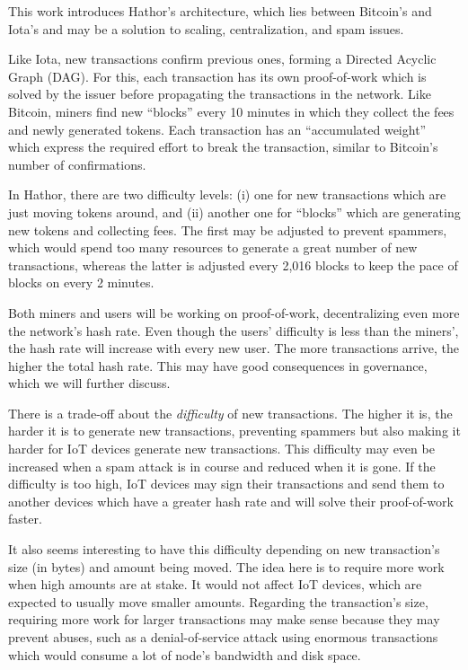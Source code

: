 
This work introduces Hathor's architecture, which lies between Bitcoin's and Iota's and may be a solution to scaling, centralization, and spam issues.

Like Iota, new transactions confirm previous ones, forming a Directed Acyclic Graph (DAG). For this, each transaction has its own proof-of-work which is solved by the issuer before propagating the transactions in the network. Like Bitcoin, miners find new ``blocks'' every 10 minutes in which they collect the fees and newly generated tokens. Each transaction has an ``accumulated weight'' which express the required effort to break the transaction, similar to Bitcoin's number of confirmations.

In Hathor, there are two difficulty levels: (i) one for new transactions which are just moving tokens around, and (ii) another one for ``blocks'' which are generating new tokens and collecting fees. The first may be adjusted to prevent spammers, which would spend too many resources to generate a great number of new transactions, whereas the latter is adjusted every 2,016 blocks to keep the pace of blocks on every 2 minutes.

Both miners and users will be working on proof-of-work, decentralizing even more the network's hash rate. Even though the users' difficulty is less than the miners', the hash rate will increase with every new user. The more transactions arrive, the higher the total hash rate. This may have good consequences in governance, which we will further discuss.

There is a trade-off about the \textit{difficulty} of new transactions. The higher it is, the harder it is to generate new transactions, preventing spammers but also making it harder for IoT devices generate new transactions. This difficulty may even be increased when a spam attack is in course and reduced when it is gone. If the difficulty is too high, IoT devices may sign their transactions and send them to another devices which have a greater hash rate and will solve their proof-of-work faster.

It also seems interesting to have this difficulty depending on new transaction's size (in bytes) and amount being moved. The idea here is to require more work when high amounts are at stake. It would not affect IoT devices, which are expected to usually move smaller amounts. Regarding the transaction's size, requiring more work for larger transactions may make sense because they may prevent abuses, such as a denial-of-service attack using enormous transactions which would consume a lot of node's bandwidth and disk space.

